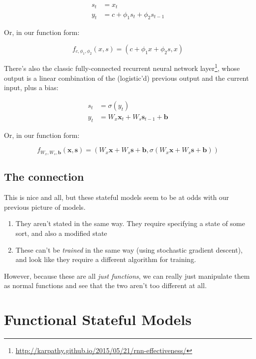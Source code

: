 \documentclass[]{article}
\renewcommand{\href}[2]{#2\footnote{\url{#1}}}
\begin{document}
\[
\begin{aligned}
s_t & = x_t \\
y_t & = c + \phi_1 s_t + \phi_2 s_{t - 1}
\end{aligned}
\]

Or, in our function form:

\[
f_{c, \phi_1, \phi_2}(x, s) = (c + \phi_1 x + \phi_2 s, x)
\]

There's also the classic
\href{http://karpathy.github.io/2015/05/21/rnn-effectiveness/}{fully-connected
recurrent neural network layer}, whose output is a linear combination of the
(logistic'd) previous output and the current input, plus a bias:

\[
\begin{aligned}
s_t & = \sigma(y_t) \\
y_t & = W_x \mathbf{x}_t + W_s \mathbf{s}_{t-1} + \mathbf{b}
\end{aligned}
\]

Or, in our function form:

\[
f_{W_x, W_s, \mathbf{b}}(\mathbf{x}, \mathbf{s}) =
  ( W_x \mathbf{x} + W_s \mathbf{s} + \mathbf{b}
  , \sigma(W_x \mathbf{x} + W_s \mathbf{s} + \mathbf{b})
  )
\]

\hypertarget{the-connection}{%
\subsection{The connection}\label{the-connection}}

This is nice and all, but these stateful models seem to be at odds with our
previous picture of models.

\begin{enumerate}
\def\labelenumi{\arabic{enumi}.}
\tightlist
\item
  They aren't stated in the same way. They require specifying a state of some
  sort, and also a modified state
\item
  These can't be \emph{trained} in the same way (using stochastic gradient
  descent), and look like they require a different algorithm for training.
\end{enumerate}

However, because these are all \emph{just functions}, we can really just
manipulate them as normal functions and see that the two aren't too different at
all.

\hypertarget{functional-stateful-models}{%
\section{Functional Stateful Models}\label{functional-stateful-models}}
\end{document}
